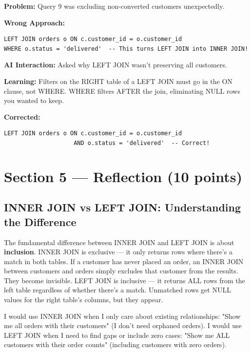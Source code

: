 \documentclass[12pt,a4paper]{article}
\begin{document}
\textbf{Problem:} Query 9 was excluding non-converted customers unexpectedly.

\textbf{Wrong Approach:}
\begin{lstlisting}
LEFT JOIN orders o ON c.customer_id = o.customer_id
WHERE o.status = 'delivered'  -- This turns LEFT JOIN into INNER JOIN!
\end{lstlisting}

\textbf{AI Interaction:} Asked why LEFT JOIN wasn't preserving all customers.

\textbf{Learning:} Filters on the RIGHT table of a LEFT JOIN must go in the ON clause,
not WHERE. WHERE filters AFTER the join, eliminating NULL rows you wanted to keep.

\textbf{Corrected:}
\begin{lstlisting}
LEFT JOIN orders o ON c.customer_id = o.customer_id
                    AND o.status = 'delivered'  -- Correct!
\end{lstlisting}

\newpage
\section{Section 5 — Reflection (10 points)}

\subsection*{INNER JOIN vs LEFT JOIN: Understanding the Difference}

The fundamental difference between INNER JOIN and LEFT JOIN is about \textbf{inclusion}.
INNER JOIN is exclusive — it only returns rows where there's a match in both tables.
If a customer has never placed an order, an INNER JOIN between customers and orders
simply excludes that customer from the results. They become invisible. LEFT JOIN is
inclusive — it returns ALL rows from the left table regardless of whether there's a
match. Unmatched rows get NULL values for the right table's columns, but they appear.

I would use INNER JOIN when I only care about existing relationships: "Show me all
orders with their customers" (I don't need orphaned orders). I would use LEFT JOIN
when I need to find gaps or include zero cases: "Show me ALL customers with their
order counts" (including customers with zero orders).
\end{document}
